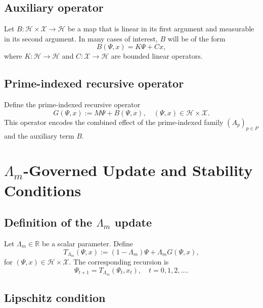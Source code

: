 \documentclass[11pt]{article}
\begin{document}
\subsection{Auxiliary operator}

Let $B : \mathcal{H} \times \mathcal{X} \to \mathcal{H}$ be a map that is linear in its first argument and measurable in its second argument. In many cases of interest, $B$ will be of the form
\begin{equation}
  B(\Psi,x) = K \Psi + C x,
\end{equation}
where $K : \mathcal{H} \to \mathcal{H}$ and $C : \mathcal{X} \to \mathcal{H}$ are bounded linear operators.

\subsection{Prime-indexed recursive operator}

Define the prime-indexed recursive operator
\begin{equation}\label{eq:G_def}
  G(\Psi,x) := M\Psi + B(\Psi,x),
  \quad
  (\Psi,x) \in \mathcal{H} \times \mathcal{X}.
\end{equation}
This operator encodes the combined effect of the prime-indexed family $(A_p)_{p \in P}$ and the auxiliary term $B$.

\section{$\Lambda_m$-Governed Update and Stability Conditions}

\subsection{Definition of the $\Lambda_m$ update}

Let $\Lambda_m \in \mathbb{R}$ be a scalar parameter. Define
\begin{equation}\label{eq:T_Lm_def}
  T_{\Lambda_m}(\Psi,x)
    := (1 - \Lambda_m)\Psi
      + \Lambda_m G(\Psi,x),
\end{equation}
for $(\Psi,x) \in \mathcal{H} \times \mathcal{X}$. The corresponding recursion is
\begin{equation}
  \Psi_{t+1} = T_{\Lambda_m}(\Psi_t, x_t),
  \quad
  t = 0,1,2,\dots.
\end{equation}

\subsection{Lipschitz condition}
\end{document}
